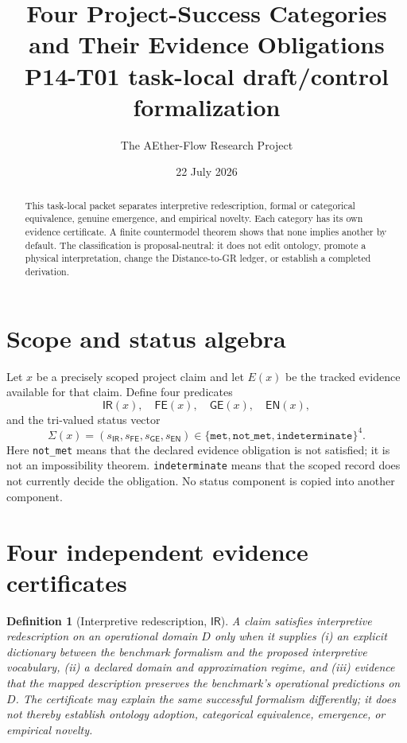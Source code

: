 \documentclass[11pt]{article}
\title{Four Project-Success Categories and Their Evidence Obligations\\\large P14-T01 task-local draft/control formalization}
\author{The AEther-Flow Research Project}
\date{22 July 2026}
\newtheorem{definition}{Definition}
\newcommand{\IR}{\mathsf{IR}}
\newcommand{\FE}{\mathsf{FE}}
\newcommand{\GE}{\mathsf{GE}}
\newcommand{\EN}{\mathsf{EN}}
\begin{document}
\maketitle

\begin{abstract}
This task-local packet separates interpretive redescription, formal or
categorical equivalence, genuine emergence, and empirical novelty.  Each
category has its own evidence certificate.  A finite countermodel theorem
shows that none implies another by default.  The classification is
proposal-neutral: it does not edit ontology, promote a physical
interpretation, change the Distance-to-GR ledger, or establish a completed
derivation.
\end{abstract}

\section{Scope and status algebra}
Let $x$ be a precisely scoped project claim and let $E(x)$ be the tracked
evidence available for that claim.  Define four predicates
\[
  \IR(x),\quad \FE(x),\quad \GE(x),\quad \EN(x),
\]
and the tri-valued status vector
\[
  \Sigma(x)=(s_{\IR},s_{\FE},s_{\GE},s_{\EN})
  \in\{\texttt{met},\texttt{not\_met},\texttt{indeterminate}\}^{4}.
\]
Here \texttt{not\_met} means that the declared evidence obligation is not
satisfied; it is not an impossibility theorem.  \texttt{indeterminate} means
that the scoped record does not currently decide the obligation.  No status
component is copied into another component.

\section{Four independent evidence certificates}

\begin{definition}[Interpretive redescription, \texorpdfstring{$\IR$}{IR}]
A claim satisfies \emph{interpretive redescription} on an operational domain
$D$ only when it supplies (i) an explicit dictionary between the benchmark
formalism and the proposed interpretive vocabulary, (ii) a declared domain
and approximation regime, and (iii) evidence that the mapped description
preserves the benchmark's operational predictions on $D$.  The certificate
may explain the same successful formalism differently; it does not thereby
establish ontology adoption, categorical equivalence, emergence, or empirical
novelty.
\end{definition}
\end{document}
